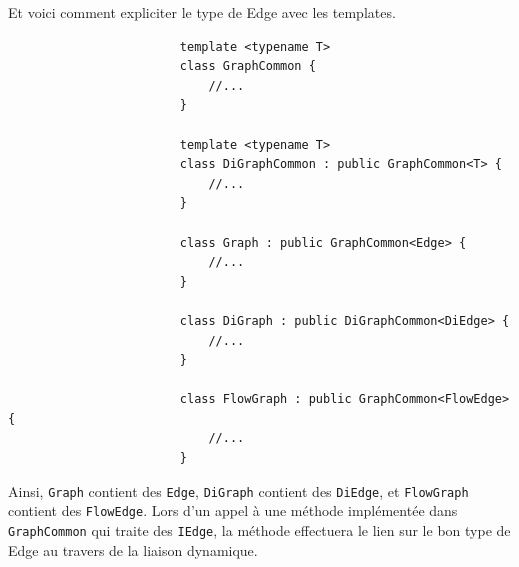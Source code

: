 \documentclass[french]{article}
\begin{document}
			Et voici comment expliciter le type de Edge avec les templates.
			\begin{lstlisting}
						template <typename T>
						class GraphCommon {
							//...
						}
						
						template <typename T>
						class DiGraphCommon : public GraphCommon<T> {
							//...
						}
						
						class Graph : public GraphCommon<Edge> {
							//...
						}
						
						class DiGraph : public DiGraphCommon<DiEdge> {
							//...
						}
						
						class FlowGraph : public GraphCommon<FlowEdge> {
							//...
						}
			\end{lstlisting}
			Ainsi, \lstinline[basicstyle=\ttfamily\color{blue}]|Graph| contient des \lstinline[basicstyle=\ttfamily\color{blue}]|Edge|, \lstinline[basicstyle=\ttfamily\color{blue}]|DiGraph| contient des \lstinline[basicstyle=\ttfamily\color{blue}]|DiEdge|, et \lstinline[basicstyle=\ttfamily\color{blue}]|FlowGraph| contient des \lstinline[basicstyle=\ttfamily\color{blue}]|FlowEdge|. Lors d'un appel à une méthode implémentée dans \lstinline[basicstyle=\ttfamily\color{blue}]|GraphCommon| qui traite des \lstinline[basicstyle=\ttfamily\color{blue}]|IEdge|, la méthode effectuera le lien sur le bon type de Edge au travers de la liaison dynamique.
		
\end{document}
